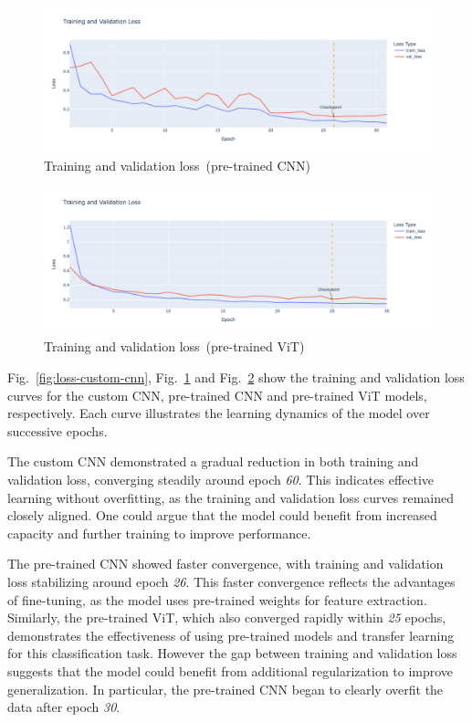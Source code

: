 \begin{figure}[htbp]
    \centerline{\includegraphics[width=0.9\linewidth]{../../resources/resnet/loss.png}}
    \caption{Training and validation loss~(pre-trained CNN)}
    \label{fig:loss-pretrained-cnn}
\end{figure}

\begin{figure}[htbp]
    \centerline{\includegraphics[width=0.9\linewidth]{../../resources/vit/loss.png}}
    \caption{Training and validation loss~(pre-trained ViT)}
    \label{fig:loss-pretrained-vit}
\end{figure}

Fig.~\ref{fig:loss-custom-cnn}, Fig.~\ref{fig:loss-pretrained-cnn} and Fig.~\ref{fig:loss-pretrained-vit} show the training and validation loss curves for the custom CNN, pre-trained CNN and pre-trained ViT models, respectively. Each curve illustrates the learning dynamics of the model over successive epochs.

The custom CNN demonstrated a gradual reduction in both training and validation loss, converging steadily around epoch \textit{60}. This indicates effective learning without overfitting, as the training and validation loss curves remained closely aligned. One could argue that the model could benefit from increased capacity and further training to improve performance.

The pre-trained CNN showed faster convergence, with training and validation loss stabilizing around epoch \textit{26}. This faster convergence reflects the advantages of fine-tuning, as the model uses pre-trained weights for feature extraction. Similarly, the pre-trained ViT, which also converged rapidly within \textit{25} epochs, demonstrates the effectiveness of using pre-trained models and transfer learning for this classification task. However the gap between training and validation loss suggests that the model could benefit from additional regularization to improve generalization. In particular, the pre-trained CNN began to clearly overfit the data after epoch \textit{30}.

